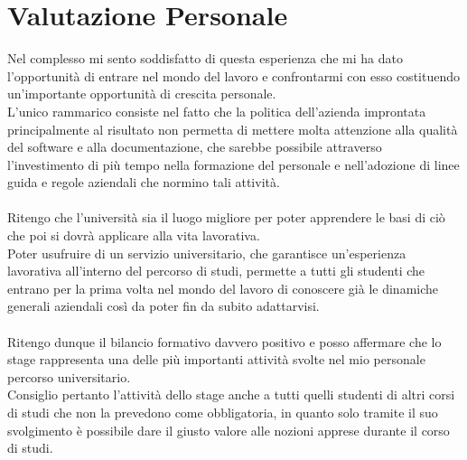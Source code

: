 \section{Valutazione Personale}
Nel complesso mi sento soddisfatto di questa esperienza che mi ha dato l’opportunità di entrare nel mondo
del lavoro e confrontarmi con esso costituendo un’importante opportunità di crescita
personale. \\
L'unico rammarico consiste nel fatto che la politica dell'azienda improntata principalmente al risultato non permetta di mettere molta attenzione alla qualità del software e alla documentazione, che sarebbe possibile attraverso l'investimento di più tempo nella formazione del personale e nell'adozione di linee guida e regole aziendali che normino tali attività.
\\ \\
Ritengo che l’università sia il luogo migliore per poter apprendere le basi di ciò che poi
si dovrà applicare alla vita lavorativa. \\
Poter usufruire di un servizio universitario, che garantisce un’esperienza lavorativa all’interno
del percorso di studi, permette a tutti gli studenti che entrano per la prima volta nel
mondo del lavoro di conoscere già le dinamiche generali aziendali così da poter fin da
subito adattarvisi. \\ \\
	Ritengo dunque il bilancio formativo davvero positivo e posso affermare che lo stage rappresenta una delle più importanti attività svolte nel mio personale percorso universitario. \\
Consiglio pertanto l’attività dello stage anche a tutti quelli studenti di altri corsi di
studi che non la prevedono come obbligatoria, in quanto solo tramite il suo svolgimento è possibile dare il giusto valore alle nozioni apprese durante il corso di studi.
